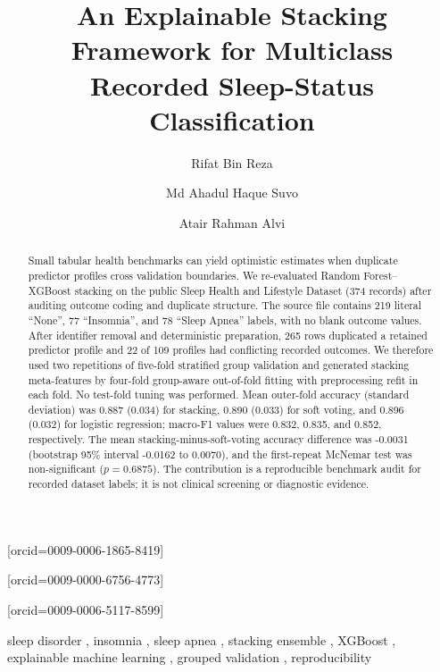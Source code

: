 \documentclass[a4paper,fleqn]{cas-dc}
\begin{document}
\raggedbottom
\shorttitle{}
\title[mode=title]{An Explainable Stacking Framework for Multiclass Recorded Sleep-Status Classification}
\author[affbrac]{Rifat Bin Reza}[orcid=0009-0006-1865-8419]
\cormark[1]
\author[affaaub]{Md Ahadul Haque Suvo}[orcid=0009-0000-6756-4773]
\author[affbrac]{Atair Rahman Alvi}[orcid=0009-0006-5117-8599]
\address[affbrac]{BSRM School of Engineering, Department of Electrical and Electronics Engineering, Brac University, Dhaka, Bangladesh}
\address[affaaub]{Aviation and Aerospace University, Department of Avionics Engineering, Dhaka, Bangladesh}
\begin{abstract}
Small tabular health benchmarks can yield optimistic estimates when duplicate predictor profiles cross validation boundaries. We re-evaluated Random Forest--XGBoost stacking on the public Sleep Health and Lifestyle Dataset (374 records) after auditing outcome coding and duplicate structure. The source file contains 219 literal ``None'', 77 ``Insomnia'', and 78 ``Sleep Apnea'' labels, with no blank outcome values. After identifier removal and deterministic preparation, 265 rows duplicated a retained predictor profile and 22 of 109 profiles had conflicting recorded outcomes. We therefore used two repetitions of five-fold stratified group validation and generated stacking meta-features by four-fold group-aware out-of-fold fitting with preprocessing refit in each fold. No test-fold tuning was performed. Mean outer-fold accuracy (standard deviation) was 0.887 (0.034) for stacking, 0.890 (0.033) for soft voting, and 0.896 (0.032) for logistic regression; macro-F1 values were 0.832, 0.835, and 0.852, respectively. The mean stacking-minus-soft-voting accuracy difference was -0.0031 (bootstrap 95\% interval -0.0162 to 0.0070), and the first-repeat McNemar test was non-significant ($p=0.6875$). The contribution is a reproducible benchmark audit for recorded dataset labels; it is not clinical screening or diagnostic evidence.
\end{abstract}
\begin{keywords}
sleep disorder \sep
insomnia \sep
sleep apnea \sep
stacking ensemble \sep
XGBoost \sep
explainable machine learning \sep
grouped validation \sep
reproducibility
\end{keywords}
\end{document}
